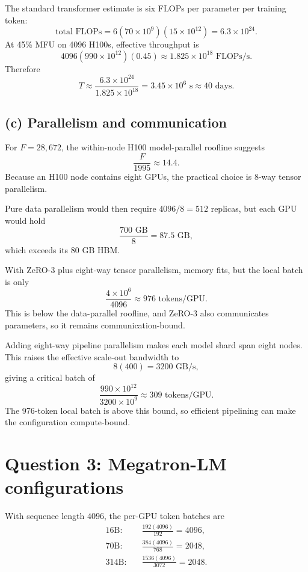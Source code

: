 \documentclass[11pt]{article}
\begin{document}
The standard transformer estimate is six FLOPs per parameter per training
token:
\[
\text{total FLOPs}
=6(70\times10^9)(15\times10^{12})
=6.3\times10^{24}.
\]
At 45\% MFU on 4096 H100s, effective throughput is
\[
4096(990\times10^{12})(0.45)
\approx1.825\times10^{18}\text{ FLOPs/s}.
\]
Therefore
\[
\boxed{
T\approx\frac{6.3\times10^{24}}{1.825\times10^{18}}
=3.45\times10^6\text{ s}\approx40\text{ days}.}
\]

\subsection*{(c) Parallelism and communication}

For \(F=28{,}672\), the within-node H100 model-parallel roofline suggests
\[
\frac{F}{1995}\approx14.4.
\]
Because an H100 node contains eight GPUs, the practical choice is
\(\boxed{8}\)-way tensor parallelism.

Pure data parallelism would then require \(4096/8=512\) replicas, but each
GPU would hold
\[
\frac{700\text{ GB}}8=87.5\text{ GB},
\]
which exceeds its 80 GB HBM.

With ZeRO-3 plus eight-way tensor parallelism, memory fits, but the local
batch is only
\[
\frac{4\times10^6}{4096}\approx976\text{ tokens/GPU}.
\]
This is below the data-parallel roofline, and ZeRO-3 also communicates
parameters, so it remains communication-bound.

Adding eight-way pipeline parallelism makes each model shard span eight
nodes.  This raises the effective scale-out bandwidth to
\[
8(400)=3200\text{ GB/s},
\]
giving a critical batch of
\[
\boxed{
\frac{990\times10^{12}}{3200\times10^9}
\approx309\text{ tokens/GPU}.}
\]
The 976-token local batch is above this bound, so efficient pipelining can
make the configuration compute-bound.

\section*{Question 3: Megatron-LM configurations}

With sequence length \(4096\), the per-GPU token batches are
\begin{align*}
16\text{B:}\quad&
\frac{192(4096)}{192}
=\boxed{4096},\\
70\text{B:}\quad&
\frac{384(4096)}{768}
=\boxed{2048},\\
314\text{B:}\quad&
\frac{1536(4096)}{3072}
=\boxed{2048}.
\end{align*}
\end{document}
